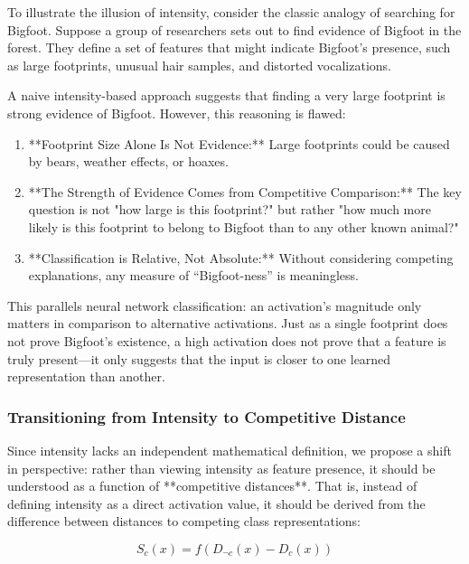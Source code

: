 To illustrate the illusion of intensity, consider the classic analogy of searching for Bigfoot. Suppose a group of researchers sets out to find evidence of Bigfoot in the forest. They define a set of features that might indicate Bigfoot’s presence, such as large footprints, unusual hair samples, and distorted vocalizations.

A naive intensity-based approach suggests that finding a very large footprint is strong evidence of Bigfoot. However, this reasoning is flawed:

\begin{enumerate}
    \item **Footprint Size Alone Is Not Evidence:** Large footprints could be caused by bears, weather effects, or hoaxes.
    \item **The Strength of Evidence Comes from Competitive Comparison:** The key question is not "how large is this footprint?" but rather "how much more likely is this footprint to belong to Bigfoot than to any other known animal?"
    \item **Classification is Relative, Not Absolute:** Without considering competing explanations, any measure of “Bigfoot-ness” is meaningless.
\end{enumerate}


This parallels neural network classification: an activation’s magnitude only matters in comparison to alternative activations. Just as a single footprint does not prove Bigfoot’s existence, a high activation does not prove that a feature is truly present—it only suggests that the input is closer to one learned representation than another.

\subsubsection{Transitioning from Intensity to Competitive Distance}

Since intensity lacks an independent mathematical definition, we propose a shift in perspective: rather than viewing intensity as feature presence, it should be understood as a function of **competitive distances**. That is, instead of defining intensity as a direct activation value, it should be derived from the difference between distances to competing class representations:

\[
S_c(x) = f(D_{\neg c}(x) - D_c(x))
\]

